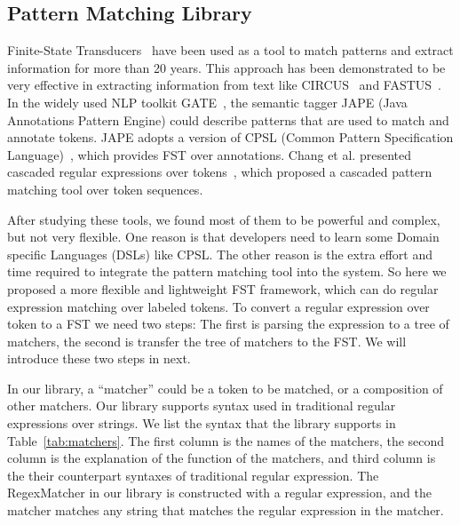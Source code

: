 \subsection{Pattern Matching Library}
\label{subsec1}

Finite-State Transducers~\cite{roche1997finite} have been used as a tool to match patterns and extract information for more than 20 years. This approach has been demonstrated to be very effective in extracting information from text like CIRCUS~\cite{lehnert1991university} and FASTUS~\cite{hobbs199713}.  In the widely used NLP toolkit GATE~\cite{cunningham2002framework}, the semantic tagger JAPE (Java Annotations Pattern Engine) could describe patterns that are used to match and annotate tokens. JAPE adopts a version of CPSL (Common Pattern  Specification Language)~\cite{appelt1998common}, which provides FST over annotations. Chang et al. presented cascaded regular expressions over tokens~\cite{chang2014tokensregex}, which proposed a cascaded pattern matching tool over token sequences.

After studying these tools, we found most of them to be powerful and complex, but not very flexible. One reason is that developers need to learn some Domain specific Languages (DSLs) like CPSL. The other reason is the extra effort and time required to integrate the pattern matching tool into the system. So here we proposed a more flexible and lightweight FST framework, which can do regular expression matching over labeled tokens. To convert a regular expression over token to a FST we need two steps: The first is parsing the expression to a tree of matchers, the second is transfer the tree of matchers to the FST. We will introduce these two steps in next.

In our library, a ``matcher'' could be a token to be matched, or a composition of other matchers. Our library supports syntax used in traditional regular expressions over strings. We list the syntax that the library supports in Table~\ref{tab:matchers}. The first column is the names of the matchers, the second column is the explanation of the function of the matchers, and third column is the their counterpart syntaxes of traditional regular expression. The RegexMatcher in our library is constructed with a regular expression, and the matcher matches any string that matches the regular expression in the matcher. 

